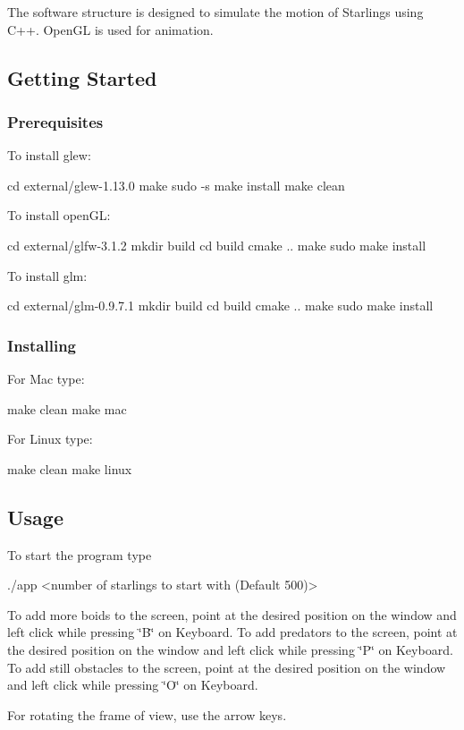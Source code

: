 The software structure is designed to simulate the motion of Starlings using C++. Open\+GL is used for animation.

\subsection*{Getting Started}

\subsubsection*{Prerequisites}

To install glew\+:


\begin{DoxyCode}
cd external/glew-1.13.0
make
sudo -s
make install
make clean
\end{DoxyCode}


To install open\+GL\+:


\begin{DoxyCode}
cd external/glfw-3.1.2
mkdir build
cd build
cmake ..
make
sudo make install
\end{DoxyCode}


To install glm\+:


\begin{DoxyCode}
cd external/glm-0.9.7.1
mkdir build
cd build
cmake ..
make
sudo make install
\end{DoxyCode}


\subsubsection*{Installing}

For Mac type\+:


\begin{DoxyCode}
make clean
make mac
\end{DoxyCode}


For Linux type\+:


\begin{DoxyCode}
make clean
make linux
\end{DoxyCode}


\subsection*{Usage}

To start the program type


\begin{DoxyCode}
./app <number of starlings to start with (Default 500)>
\end{DoxyCode}


To add more boids to the screen, point at the desired position on the window and left click while pressing \char`\"{}\+B\char`\"{} on Keyboard. To add predators to the screen, point at the desired position on the window and left click while pressing \char`\"{}\+P\char`\"{} on Keyboard. To add still obstacles to the screen, point at the desired position on the window and left click while pressing \char`\"{}\+O\char`\"{} on Keyboard.

For rotating the frame of view, use the arrow keys. 